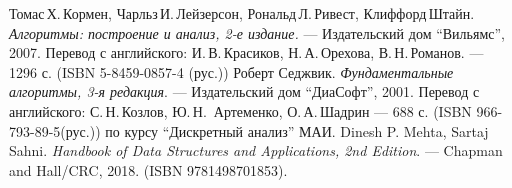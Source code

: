 \begin{thebibliography}{99}

Томас\,Х.\,Кормен, Чарльз\,И.\,Лейзерсон, Рональд\,Л.\,Ривест, Клиффорд\,Штайн.
{\itshape Алгоритмы: построение и анализ, 2-е издание.} --- Издательский дом \enquote{Вильямс}, 2007. Перевод с английского: И.\,В.\,Красиков, Н.\,А.\,Орехова, В.\,Н.\,Романов. --- 1296 с. (ISBN 5-8459-0857-4 (рус.))
Роберт Седжвик. {\itshape Фундаментальные алгоритмы, 3-я редакция}. --- Издательский дом \enquote{ДиаСофт}, 2001. Перевод с английского: С.\,Н.\,Козлов, Ю.\,Н.\, Артеменко, О.\,А.\,Шадрин --- 688 с. (ISBN 966-793-89-5(рус.))
{ по курсу \enquote{Дискретный анализ} МАИ.}
Dinesh P. Mehta, Sartaj Sahni. {\itshape Handbook of Data Structures and Applications, 2nd Edition}. --- Chapman and Hall/CRC, 2018. (ISBN 9781498701853).
\end{thebibliography}
\pagebreak



